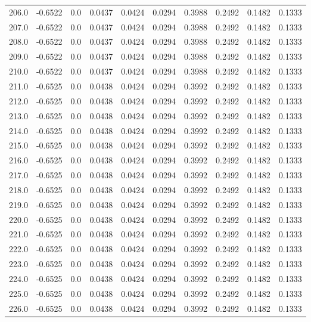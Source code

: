 \begin{longtable}{lrrrrrrrrr}
206.0 & -0.6522 & 0.0 & 0.0437 & 0.0424 & 0.0294 & 0.3988 & 0.2492 & 0.1482 & 0.1333 \\
207.0 & -0.6522 & 0.0 & 0.0437 & 0.0424 & 0.0294 & 0.3988 & 0.2492 & 0.1482 & 0.1333 \\
208.0 & -0.6522 & 0.0 & 0.0437 & 0.0424 & 0.0294 & 0.3988 & 0.2492 & 0.1482 & 0.1333 \\
209.0 & -0.6522 & 0.0 & 0.0437 & 0.0424 & 0.0294 & 0.3988 & 0.2492 & 0.1482 & 0.1333 \\
210.0 & -0.6522 & 0.0 & 0.0437 & 0.0424 & 0.0294 & 0.3988 & 0.2492 & 0.1482 & 0.1333 \\
211.0 & -0.6525 & 0.0 & 0.0438 & 0.0424 & 0.0294 & 0.3992 & 0.2492 & 0.1482 & 0.1333 \\
212.0 & -0.6525 & 0.0 & 0.0438 & 0.0424 & 0.0294 & 0.3992 & 0.2492 & 0.1482 & 0.1333 \\
213.0 & -0.6525 & 0.0 & 0.0438 & 0.0424 & 0.0294 & 0.3992 & 0.2492 & 0.1482 & 0.1333 \\
214.0 & -0.6525 & 0.0 & 0.0438 & 0.0424 & 0.0294 & 0.3992 & 0.2492 & 0.1482 & 0.1333 \\
215.0 & -0.6525 & 0.0 & 0.0438 & 0.0424 & 0.0294 & 0.3992 & 0.2492 & 0.1482 & 0.1333 \\
216.0 & -0.6525 & 0.0 & 0.0438 & 0.0424 & 0.0294 & 0.3992 & 0.2492 & 0.1482 & 0.1333 \\
217.0 & -0.6525 & 0.0 & 0.0438 & 0.0424 & 0.0294 & 0.3992 & 0.2492 & 0.1482 & 0.1333 \\
218.0 & -0.6525 & 0.0 & 0.0438 & 0.0424 & 0.0294 & 0.3992 & 0.2492 & 0.1482 & 0.1333 \\
219.0 & -0.6525 & 0.0 & 0.0438 & 0.0424 & 0.0294 & 0.3992 & 0.2492 & 0.1482 & 0.1333 \\
220.0 & -0.6525 & 0.0 & 0.0438 & 0.0424 & 0.0294 & 0.3992 & 0.2492 & 0.1482 & 0.1333 \\
221.0 & -0.6525 & 0.0 & 0.0438 & 0.0424 & 0.0294 & 0.3992 & 0.2492 & 0.1482 & 0.1333 \\
222.0 & -0.6525 & 0.0 & 0.0438 & 0.0424 & 0.0294 & 0.3992 & 0.2492 & 0.1482 & 0.1333 \\
223.0 & -0.6525 & 0.0 & 0.0438 & 0.0424 & 0.0294 & 0.3992 & 0.2492 & 0.1482 & 0.1333 \\
224.0 & -0.6525 & 0.0 & 0.0438 & 0.0424 & 0.0294 & 0.3992 & 0.2492 & 0.1482 & 0.1333 \\
225.0 & -0.6525 & 0.0 & 0.0438 & 0.0424 & 0.0294 & 0.3992 & 0.2492 & 0.1482 & 0.1333 \\
226.0 & -0.6525 & 0.0 & 0.0438 & 0.0424 & 0.0294 & 0.3992 & 0.2492 & 0.1482 & 0.1333 \\

\end{longtable}
